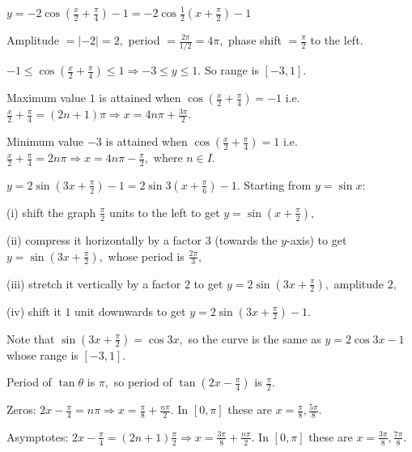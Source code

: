   \startplacefigure[title={Plot of $3\sin\left(2x - \frac{\pi}{3}\right) + 1$}, reference=fig:34_40]
    \externalfigure[34_40.pdf]
  \stopplacefigure

\item $y = -2\cos\left(\frac{x}{2} + \frac{\pi}{4}\right) - 1 = -2\cos\frac{1}{2}\left(x + \frac{\pi}{2}\right) - 1$

  Amplitude $= |-2| = 2,$ period $= \frac{2\pi}{1/2} = 4\pi,$ phase shift $= \frac{\pi}{2}$ to the left.

  $-1\leq\cos\left(\frac{x}{2} + \frac{\pi}{4}\right)\leq 1 \Rightarrow -3\leq y\leq 1.$ So range is $[-3, 1].$

  Maximum value $1$ is attained when $\cos\left(\frac{x}{2} + \frac{\pi}{4}\right) = -1$ i.e. $\frac{x}{2} +
  \frac{\pi}{4} = (2n + 1)\pi \Rightarrow x = 4n\pi + \frac{3\pi}{2}.$

  Minimum value $-3$ is attained when $\cos\left(\frac{x}{2} + \frac{\pi}{4}\right) = 1$ i.e. $\frac{x}{2} +
  \frac{\pi}{4} = 2n\pi \Rightarrow x = 4n\pi - \frac{\pi}{2},$ where $n\in I.$

\item $y = 2\sin\left(3x + \frac{\pi}{2}\right) - 1 = 2\sin3\left(x + \frac{\pi}{6}\right) - 1.$ Starting from $y = \sin
  x:$

  (i) shift the graph $\frac{\pi}{2}$ units to the left to get $y = \sin\left(x + \frac{\pi}{2}\right),$

  (ii) compress it horizontally by a factor $3$ (towards the $y$-axis) to get $y = \sin\left(3x + \frac{\pi}{2}\right),$
  whose period is $\frac{2\pi}{3},$

  (iii) stretch it vertically by a factor $2$ to get $y = 2\sin\left(3x + \frac{\pi}{2}\right),$ amplitude $2,$

  (iv) shift it $1$ unit downwards to get $y = 2\sin\left(3x + \frac{\pi}{2}\right) - 1.$

  Note that $\sin\left(3x + \frac{\pi}{2}\right) = \cos3x,$ so the curve is the same as $y = 2\cos3x - 1$ whose range is
  $[-3, 1].$

\item Period of $\tan\theta$ is $\pi,$ so period of $\tan\left(2x - \frac{\pi}{4}\right)$ is $\frac{\pi}{2}.$

  Zeros: $2x - \frac{\pi}{4} = n\pi \Rightarrow x = \frac{\pi}{8} + \frac{n\pi}{2}.$ In $[0, \pi]$ these are $x =
  \frac{\pi}{8}, \frac{5\pi}{8}.$

  Asymptotes: $2x - \frac{\pi}{4} = (2n + 1)\frac{\pi}{2} \Rightarrow x = \frac{3\pi}{8} + \frac{n\pi}{2}.$ In $[0, \pi]$
  these are $x = \frac{3\pi}{8}, \frac{7\pi}{8}.$

